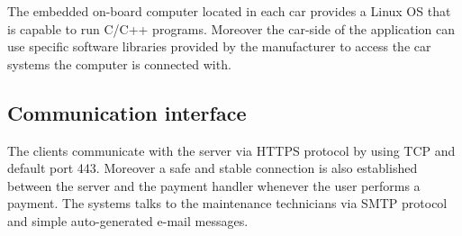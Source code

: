 The embedded on-board computer located in each car provides a Linux OS that is capable to run C/C++ programs. Moreover the car-side of the application can use specific software libraries provided by the manufacturer to access the car systems the computer is connected with.

\subsection{Communication interface}
The clients communicate with the server via HTTPS protocol by using TCP and default port 443.
Moreover a safe and stable connection is also established between the server and the payment handler whenever the user performs a payment. The systems talks to the maintenance technicians via SMTP protocol and simple auto-generated e-mail messages.